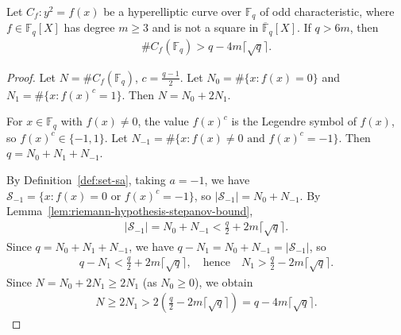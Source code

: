 \begin{lemma}\label{lem:riemann-hypothesis-lower-bound} \leanok {}
  Let $C_f : y^2 = f(x)$ be a hyperelliptic curve over $\mathbb{F}_q$ of odd characteristic, where $f \in \mathbb{F}_q[X]$ has degree $m \geq 3$ and is not a square in $\overline{\mathbb{F}}_q[X]$. If $q > 6m$, then
  \begin{align*}
    \#C_f(\mathbb{F}_q) > q - 4m\lceil\sqrt{q}\rceil.
  \end{align*}
\end{lemma}
\begin{proof} \leanok
  Let $N = \#C_f(\mathbb{F}_q)$, $c = \frac{q-1}{2}$. Let $N_0 = \#\{x : f(x) = 0\}$ and $N_1 = \#\{x : f(x)^c = 1\}$. Then $N = N_0 + 2N_1$.

  For $x \in \mathbb{F}_q$ with $f(x) \neq 0$, the value $f(x)^c$ is the Legendre symbol of $f(x)$, so $f(x)^c \in \{-1, 1\}$. Let $N_{-1} = \#\{x : f(x) \neq 0 \text{ and } f(x)^c = -1\}$. Then $q = N_0 + N_1 + N_{-1}$.

  By Definition~\ref{def:set-sa}, taking $a = -1$, we have $\mathcal{S}_{-1} = \{x : f(x) = 0 \text{ or } f(x)^c = -1\}$, so $|\mathcal{S}_{-1}| = N_0 + N_{-1}$. By Lemma~\ref{lem:riemann-hypothesis-stepanov-bound},
  \begin{align*}
    |\mathcal{S}_{-1}| = N_0 + N_{-1} < \frac{q}{2} + 2m\lceil\sqrt{q}\rceil.
  \end{align*}
  Since $q = N_0 + N_1 + N_{-1}$, we have $q - N_1 = N_0 + N_{-1} = |\mathcal{S}_{-1}|$, so
  \begin{align*}
    q - N_1 < \frac{q}{2} + 2m\lceil\sqrt{q}\rceil, \quad \text{hence} \quad N_1 > \frac{q}{2} - 2m\lceil\sqrt{q}\rceil.
  \end{align*}
  Since $N = N_0 + 2N_1 \geq 2N_1$ (as $N_0 \geq 0$), we obtain
  \begin{align*}
    N \geq 2N_1 > 2\left(\frac{q}{2} - 2m\lceil\sqrt{q}\rceil\right) = q - 4m\lceil\sqrt{q}\rceil.
  \end{align*}
\end{proof}

